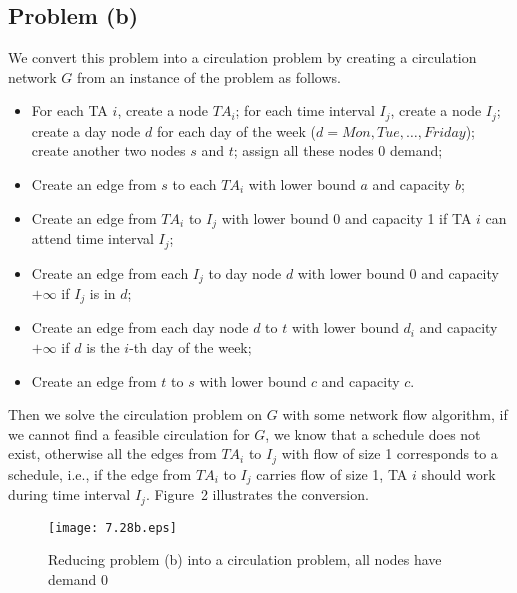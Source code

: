 \documentclass[12pt,letterpaper]{article}
\begin{document}
\subsection*{Problem (b)}
We convert this problem into a circulation problem by creating a circulation network $G$ from an instance of the problem as follows.
\begin{itemize}
\item For each TA $i$, create a node $TA_i$; for each time interval $I_j$, create a node $I_j$; create a day node $d$ for each day of the week ($d=Mon, Tue, \dots, Friday$); create another two nodes $s$ and $t$; assign all these nodes 0 demand;
\item Create an edge from $s$ to each $TA_i$ with lower bound $a$ and capacity $b$;
\item Create an edge from $TA_i$ to $I_j$ with lower bound 0 and capacity 1 if TA $i$ can attend time interval $I_j$;
\item Create an edge from each $I_j$ to day node $d$ with lower bound 0 and capacity $+\infty$ if $I_j$ is in $d$;
\item Create an edge from each day node $d$ to $t$ with lower bound $d_i$ and capacity $+\infty$ if $d$ is the $i$-th day of the week;
\item Create an edge from $t$ to $s$ with lower bound $c$ and capacity $c$.
\end{itemize}
Then we solve the circulation problem on $G$ with some network flow algorithm, if we cannot find a feasible circulation for $G$, we know that a schedule does not exist, otherwise all the edges from $TA_i$ to $I_j$ with flow of size 1 corresponds to a schedule, i.e., if the edge from $TA_i$ to $I_j$ carries flow of size 1, TA $i$ should work during time interval $I_j$. Figure~2 illustrates the conversion.
\begin{figure}
\begin{center}
\texttt{[image: 7.28b.eps]}
\caption{Reducing problem (b) into a circulation problem, all nodes have demand 0}
\end{center}
\end{figure}
\end{document}
